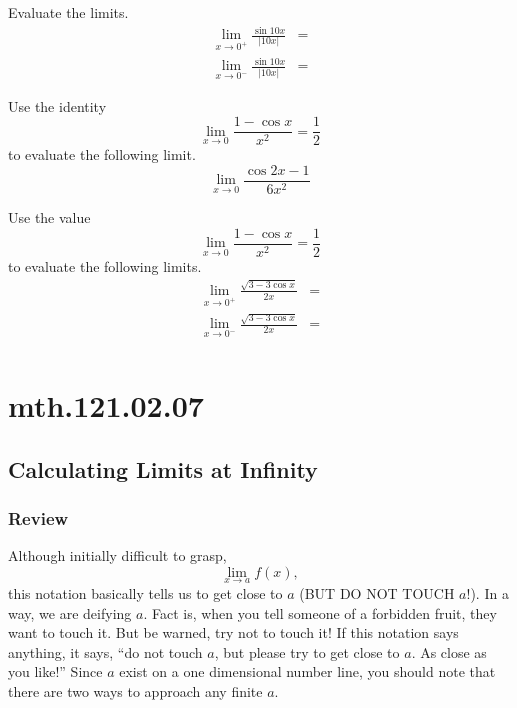 \documentclass[12pt,addpoints, answers, fleqn]{exam}
\begin{document}
\begin{teacher}
\begin{questions}
Evaluate the limits.
\begin{align*}
\lim_{x \to 0^+} \frac{\sin 10x}{\left| 10 x \right|} &=\\[10pt]
\lim_{x \to 0^-} \frac{\sin 10x}{\left| 10 x \right|} &=
\end{align*}
\begin{solution}

\end{solution}

\question 	%

Use the identity
\[
\lim_{x \to 0} \frac{1 - \cos x}{x^2} = \frac{1}{2}
\]
to evaluate the following limit.
\[
\lim_{x \to 0} \frac{\cos 2x - 1}{6x^2}
\]
\begin{solution}

\end{solution}

\question 	%

Use the value
\[
\lim_{x \to 0} \frac{1 - \cos x}{x^2} = \frac{1}{2}
\]
to evaluate the following limits.
\begin{align*}
\lim_{x \to 0^+} \frac{\sqrt{3 - 3 \cos x}}{2x} &=\\[10pt]
\lim_{x \to 0^-} \frac{\sqrt{3 - 3 \cos x}}{2x} &=\\
\end{align*}
\begin{solution}

\end{solution}
\end{questions}
\end{teacher}
\vfill
\pagebreak

\section{mth.121.02.07}
\subsection{Calculating Limits at Infinity}



\subsubsection{Review}
Although initially difficult to grasp,
\[
\mathop {\lim }\limits_{x \to a}  f \left( x \right),
\]
this notation basically tells us to get close to $a$ (BUT DO NOT TOUCH $a$!). In a way, we are deifying $a$. Fact is, when you tell someone of a forbidden fruit, they want to touch it. But be warned, try not to touch it! If this notation says anything, it says, ``do not touch $a$, but please try to get close to $a$. As close as you like!'' Since $a$ exist on a one dimensional number line, you should note that there are two ways to approach any finite $a$.
\end{document}
